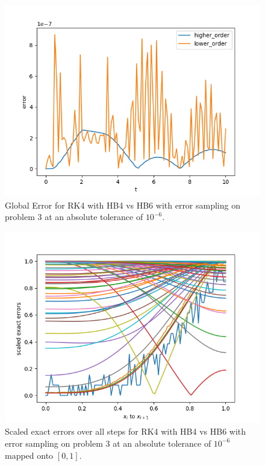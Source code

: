 \begin{figure}[H]
\centering
\includegraphics[width=0.7\linewidth]{./figures/rk4_with_hb4_hb6_sampling_p3_global_error}
\caption{Global Error for RK4 with HB4 vs HB6 with error sampling on problem 3 at an absolute tolerance of $10^{-6}$.}
\label{fig:rk4_with_hb4_hb6_sampling_p3_global_error}
\end{figure}

\begin{figure}[H]
\centering
\includegraphics[width=0.7\linewidth]{./figures/rk4_with_hb4_hb6_sampling_p3_scaled_errors}
\caption{Scaled exact errors over all steps for RK4 with HB4 vs HB6 with error sampling on problem 3 at an absolute tolerance of $10^{-6}$ mapped onto $[0, 1]$.}
\label{fig:rk4_with_hb4_hb6_sampling_p3_scaled_errors}
\end{figure}

